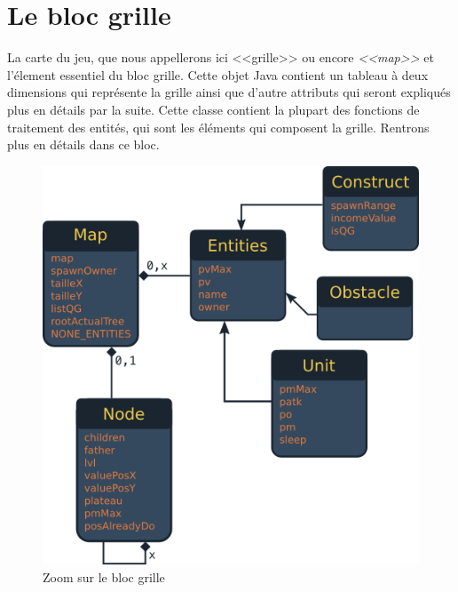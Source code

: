 \documentclass[a4paper, titlepage]{livret}
\begin{document}
    \section{Le bloc grille}
        La carte du jeu, que nous appellerons ici <<grille>> ou encore \textit{<<map>>} et l'élement essentiel du bloc grille. Cette objet Java contient un tableau à deux dimensions qui représente la grille ainsi que d'autre attributs qui seront expliqués plus en détails par la suite. Cette classe contient la plupart des fonctions de traitement des entités, qui sont les éléments qui composent la grille. Rentrons plus en détails dans ce bloc.
    \begin{figure}[th]
      \begin{center}
        \includegraphics[scale=0.4]{Assets/umlBlocGrille.png}
        \caption{Zoom sur le bloc grille}
        \label{fig6}
      \end{center}
    \end{figure}
\end{document}
